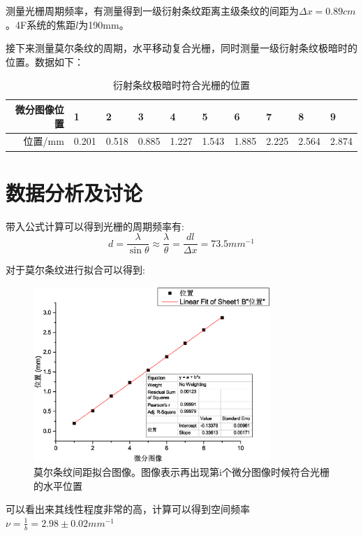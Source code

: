 \documentclass[aps,pre,12pt,preprint,onecolumn,showpacs,showkeys,UTF8]{revtex4-1}
\begin{document}
测量光栅周期频率，有测量得到一级衍射条纹距离主级条纹的间距为$\Delta x=0.89cm$。4F系统的焦距$l$为190mm。

接下来测量莫尔条纹的周期，水平移动复合光栅，同时测量一级衍射条纹极暗时的位置。数据如下：

\begin{center}
	\begin{table}[h]
		\caption{衍射条纹极暗时符合光栅的位置}
		\begin{tabularx}{15cm}{r|XXXXXXXXX}
			\hline
			微分图像位置&1&2&3&4&5&6&7&8&9\\
			\hline
			位置/mm&0.201&0.518&0.885&1.227&1.543&1.885&2.225&2.564&2.874\\
			\hline
		\end{tabularx}
	\end{table}
\end{center}


\section{数据分析及讨论}

带入公式计算可以得到光栅的周期频率有:
$$d=\frac{\lambda}{\sin{\theta}}\approx\frac{\lambda}{\theta}=\frac{dl}{\Delta x}=73.5 mm^{-1}$$

对于莫尔条纹进行拟合可以得到:

\begin{figure}[h]
	\begin{center}
		\includegraphics[width=0.8\textwidth]{pic6.eps}
		\caption{\label{fig:exp3}莫尔条纹间距拟合图像。图像表示再出现第i个微分图像时候符合光栅的水平位置}
	\end{center}
\end{figure}
\newpage
可以看出来其线性程度非常的高，计算可以得到空间频率$\nu=\frac{1}{b}=2.98 \pm 0.02 mm^{-1}$
\end{document}
